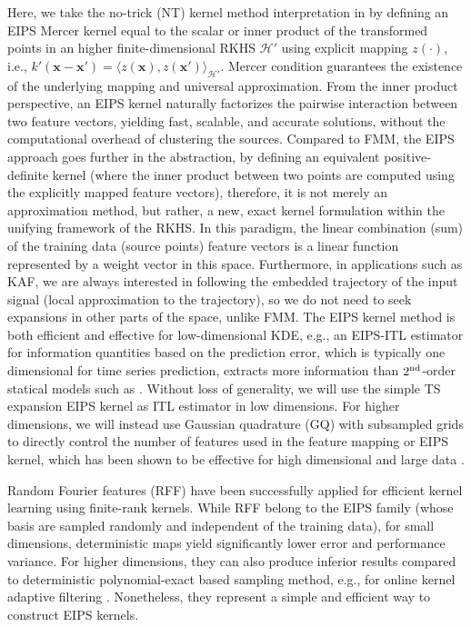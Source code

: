 \documentclass[8pt,twocolumn]{IEEEtran}
\newcommand{\x}{\mathbf{x}}
\begin{document}
Here, we take the no-trick (NT) kernel method interpretation in \cite{Li2019notrick} by defining an EIPS Mercer kernel equal to the scalar or inner product of the transformed points in an higher finite-dimensional RKHS $\mathcal{H}'$ using explicit mapping $z(\cdot)$, i.e., $k'(\x-\x')=\langle z(\x),z(\x')\rangle_{\mathcal{H}'}$. Mercer condition guarantees the existence of the underlying mapping and universal approximation. From the inner product perspective, an EIPS kernel naturally factorizes the pairwise interaction between two feature vectors, yielding fast, scalable, and accurate solutions, without the computational overhead of clustering the sources. Compared to FMM, the EIPS approach goes further in the abstraction, by defining an equivalent positive-definite kernel (where the inner product between two points are computed using the explicitly mapped feature vectors), therefore, it is not merely an approximation method, but rather, a new, exact kernel formulation within the unifying framework of the RKHS. In this paradigm, the linear combination (sum) of the training data (source points) feature vectors is a linear function represented by a weight vector in this space. Furthermore, in applications such as KAF, we are always interested in following the embedded trajectory of the input signal (local approximation to the trajectory), so we do not need to seek expansions in other parts of the space, unlike FMM. The EIPS kernel method is both efficient and effective for low-dimensional KDE, e.g., an EIPS-ITL estimator for information quantities based on the prediction error, which is typically one dimensional for time series prediction, extracts more information than $2\textsuperscript{nd}$-order statical models such as \cite{Li13KAFCI}. Without loss of generality, we will use the simple TS expansion EIPS kernel as ITL estimator in low dimensions. For higher dimensions, we will instead use Gaussian quadrature (GQ) with subsampled grids to directly control the number of features used in the feature mapping or EIPS kernel, which has been shown to be effective for high dimensional and large data \cite{Dao2017}.

Random Fourier features (RFF) \cite{rahimi2007RFF} have been successfully applied for efficient kernel learning using finite-rank kernels. While RFF belong to the EIPS family (whose basis are sampled randomly and independent of the training data), for small dimensions, deterministic maps yield significantly lower error and performance variance. For higher dimensions, they can also produce inferior results compared to deterministic polynomial-exact based sampling method, e.g., for online kernel adaptive filtering \cite{Li2019notrick}. Nonetheless, they represent a simple and efficient way to construct EIPS kernels.
\end{document}
